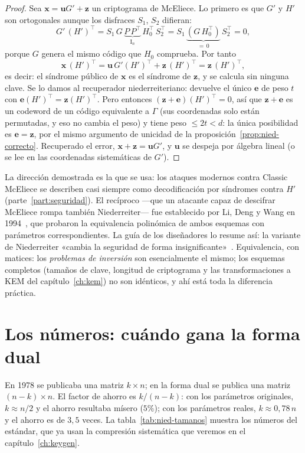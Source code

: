 \documentclass[11pt,a4paper,oneside]{report}
\newcommand{\ve}{\mathbf{e}}
\newcommand{\vx}{\mathbf{x}}
\newcommand{\vu}{\mathbf{u}}
\newcommand{\vz}{\mathbf{z}}
\begin{document}
\begin{proof}
Sea $\vx=\vu G'+\vz$ un criptograma de McEliece. Lo primero es que
$G'$ y $H'$ son ortogonales aunque los disfraces $S_1$, $S_2$ difieran:
\[
  G'\,(H')^{\top}
  = S_1\,G\,\underbrace{P\,P^{\top}}_{\mathrm{I}_n}\,H_0^{\top}\,S_2^{\top}
  = S_1\,\underbrace{(G\,H_0^{\top})}_{=\,0}\,S_2^{\top}
  = 0 ,
\]
porque $G$ genera el mismo código que $H_0$ comprueba. Por tanto
\[
  \vx\,(H')^{\top}
  = \vu\,G'(H')^{\top}+\vz\,(H')^{\top}
  = \vz\,(H')^{\top},
\]
es decir: el síndrome público de $\vx$ es el síndrome de $\vz$, y se
calcula sin ninguna clave. Se lo damos al recuperador niederreiteriano:
devuelve el único $\ve$ de peso $t$ con
$\ve(H')^{\top}=\vz(H')^{\top}$. Pero entonces
$(\vz+\ve)(H')^{\top}=0$, así que $\vz+\ve$ es un codeword de un código
equivalente a $\Gamma$ (sus coordenadas solo están permutadas, y eso no
cambia el peso) y tiene peso $\le2t<d$: la única posibilidad es
$\ve=\vz$, por el mismo argumento de unicidad de la
proposición~\ref{prop:nied-correcto}. Recuperado el error,
$\vx+\vz=\vu G'$, y $\vu$ se despeja por álgebra lineal (o se lee en
las coordenadas sistemáticas de $G'$).
\end{proof}

La dirección demostrada es la que se usa: los ataques modernos contra
Classic McEliece se describen casi siempre como decodificación por
síndromes contra $H'$ (parte~\ref{part:seguridad}). El recíproco —que un
atacante capaz de descifrar McEliece rompa también Niederreiter— fue
establecido por Li, Deng y Wang en 1994~\cite{lidw1994}, que probaron
la equivalencia polinómica de ambos esquemas con parámetros
correspondientes. La guía de los diseñadores lo resume así: la variante
de Niederreiter «cambia la seguridad de forma
insignificante»~\cite{cmrationale}. Equivalencia, con matices: los
\emph{problemas de inversión} son esencialmente el mismo; los esquemas
completos (tamaños de clave, longitud de criptograma y las
transformaciones a KEM del capítulo~\ref{ch:kem}) no son idénticos, y
ahí está toda la diferencia práctica.

\section{Los números: cuándo gana la forma dual}

En 1978 se publicaba una matriz $k\times n$; en la forma dual se publica
una matriz $(n-k)\times n$. El factor de ahorro es $k/(n-k)$: con los
parámetros originales, $k\approx n/2$ y el ahorro resultaba mísero
($5\%$); con los parámetros reales, $k\approx0{,}78\,n$ y el ahorro es
de $3{,}5$ veces. La tabla~\ref{tab:nied-tamanos} muestra los números
del estándar, que ya usan la compresión sistemática que veremos en el
capítulo~\ref{ch:keygen}.
\end{document}
